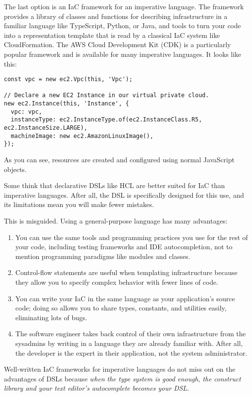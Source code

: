 \documentclass{article}
\begin{document}
The last option is an IaC framework for an imperative language.
The framework provides a library of classes and functions for describing infrastructure in a familiar language like TypeScript, Python, or Java, and tools to turn your code into a representation template that is read by a classical IaC system like CloudFormation.
The AWS Cloud Development Kit (CDK) is a particularly popular framework and is available for many imperative languages.
It looks like this:

\begin{verbatim}
const vpc = new ec2.Vpc(this, 'Vpc');

// Declare a new EC2 Instance in our virtual private cloud.
new ec2.Instance(this, 'Instance', {
  vpc: vpc,
  instanceType: ec2.InstanceType.of(ec2.InstanceClass.R5, ec2.InstanceSize.LARGE),
  machineImage: new ec2.AmazonLinuxImage(),
});
\end{verbatim}

As you can see, resources are created and configured using normal JavaScript objects.

Some think that declarative DSLs like HCL are better suited for IaC than imperative languages.
After all, the DSL is specifically designed for this use, and its limitations mean you will make fewer mistakes.

This is misguided.
Using a general-purpose language has many advantages:

\begin{enumerate}
  \item You can use the same tools and programming practices you use for the rest of your code, including testing frameworks and IDE autocompletion, not to mention programming paradigms like modules and classes.
  \item Control-flow statements are useful when templating infrastructure because they allow you to specify complex behavior with fewer lines of code.
  \item You can write your IaC in the same language as your application's source code; doing so allows you to share types, constants, and utilities easily, eliminating lots of bugs.
  \item The software engineer takes back control of their own infrastructure from the sysadmins by writing in a language they are already familiar with.
    After all, the developer is the expert in their application, not the system administrator.
\end{enumerate}

Well-written IaC frameworks for imperative languages do not miss out on the advantages of DSLs because \textit{when the type system is good enough, the construct library and your text editor's autocomplete becomes your DSL.}
\end{document}
